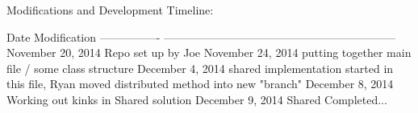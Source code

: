 \begin{DoxyParagraph}{Modifications and Development Timeline\-:}
\begin{DoxyVerb}Date              Modification
----------------  --------------------------------------------------------------
November 20, 2014 Repo set up by Joe
November 24, 2014 putting together main file / some class structure
December  4, 2014 shared implementation started in this file, Ryan moved
                  distributed method into new "branch"
December  8, 2014 Working out kinks in Shared solution
December  9, 2014 Shared Completed...
\end{DoxyVerb}
 
\end{DoxyParagraph}
